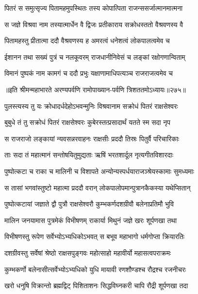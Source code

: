 \twolineshloka
{पितरं स समुत्सृज्य पितामहमुपस्थितः}
{तस्य कोपात्पिता राजन्ससर्जात्मानमात्मना}


\twolineshloka
{स जज्ञे विश्रवा नाम तस्यात्मार्धेन वै द्विजः}
{प्रतीकाराय सक्रोधस्ततो वैश्रवणस्य वै}


\twolineshloka
{पितामहस्तु प्रीतात्मा ददौ वैश्रवणस्य ह}
{अमरत्वं धनेशत्वं लोकपालत्वमेव च}


\twolineshloka
{ईशानन तथा सख्यं पुत्रं च नलकूवरम्}
{राजधानीनिवेसं च लङ्कां रक्षोगणान्विताम्}


\twolineshloka
{विमानं पुष्पकं नाम कामगं च ददौ प्रभुः}
{यक्षाणामाधिपत्यञ्च राजराजत्वमेव च}


॥इति श्रीमन्महाभारते अरण्यपर्वणि रामोपाख्यान-पर्वणि त्रिशततमोऽध्यायः॥२७५॥

\storymeta

\resetShloka
{}


\twolineshloka
{पुलस्त्यस्य तु यः क्रोधादर्धदेहोऽभवन्मुनिः}
{विश्रवानाम सक्रोधं पितरं राक्षसेश्वरः}


\twolineshloka
{बुबुधे तं तु सक्रोधं पितरं राक्षसेश्वरः}
{कुबेरस्तत्प्रसादार्थं यतते स्म सदा नृप}


\twolineshloka
{स राजराजो लङ्कायां न्यवसन्नरवाहनः}
{राक्षसीः प्रददौ तिस्रः पितुर्वै परिचारिकाः}


\twolineshloka
{ताः सदा तं महात्मानं सन्तोषयितुमुद्यताः}
{ऋषिं भरतशार्दूल नृत्यगीतविशारदाः}


\twolineshloka
{पुष्पोत्कटा च राका च मालिनी च विशापते}
{अन्योन्यस्पर्धयाराजञ्श्रेयस्कामाः सुमध्यमाः}


\twolineshloka
{स तासां भगवांस्तुष्टो महात्मा प्रददौ वरान्}
{लोकपालोपमान्पुत्रानकैकस्या यथेप्सितान्}


\twolineshloka
{पुष्पोत्कटायां जज्ञाते द्वौ पुत्रौ राक्षसेश्वरौ}
{कुम्भकर्णदशग्रीवौ बलेनाप्रतिमौ भुवि}


\twolineshloka
{मालिन जनयामास पुत्रमेकं विभीषणम्}
{राकार्या मिथुनं जज्ञे खरः शूर्पणखा तथा}


\twolineshloka
{विभीषणस्तु रूपेण सर्वेभ्योऽभ्यधिकोऽभवत्}
{स बभूव महाभागो धर्मगोप्ता क्रियारतिः}


\twolineshloka
{दशग्रीवस्तु सर्वेषां श्रेष्ठो राक्षसपुङ्गवः}
{महोत्साहो महावीर्यो महासत्वपराक्रमः}


\twolineshloka
{कुम्भकर्णो बलेनासीत्सर्वेभ्योऽभ्यधिको युधि}
{मायावी रणशौण्डश्च रौद्रश्च रजनीचरः}


\twolineshloka
{खरो धनुषि विक्रान्तो ब्रह्मद्विट् पिशिताशनः}
{सिद्धविघ्नकरी चापि रौद्री शूर्पणखा तदा}


